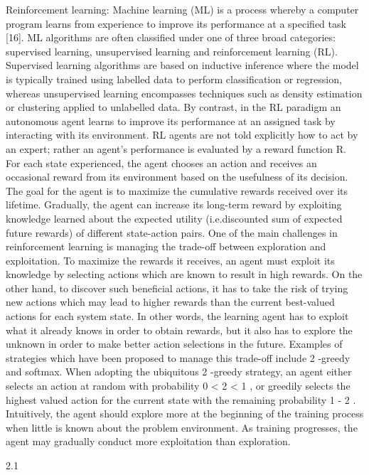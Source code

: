	
Reinforcement learning:
Machine learning (ML) is a process whereby a computer program learns from experience to improve its performance at a specified task [16]. ML algorithms are often classified under
one of three broad categories: supervised learning, unsupervised learning and reinforcement learning (RL). Supervised learning algorithms are based on inductive inference where the model is typically trained using labelled data to perform classification or regression, whereas unsupervised learning encompasses techniques such as density estimation or clustering applied to unlabelled data. By contrast, in the RL paradigm an autonomous agent learns to improve its performance at an assigned task by interacting with its environment.
RL agents are not told explicitly how to act by an expert; rather an agent's performance is evaluated by a reward function R. For each state experienced, the agent chooses an action and receives an occasional reward from its environment based on the usefulness of its decision. The goal for the agent is to maximize the cumulative rewards received over its lifetime. Gradually, the agent can increase its long-term reward by exploiting knowledge learned about the expected utility (i.e.discounted sum of expected future rewards) of different state-action pairs. One of the main challenges in reinforcement learning is managing the trade-off between exploration and exploitation. To maximize the rewards it receives, an agent must exploit its knowledge by selecting actions which are known to result in high rewards. On the other hand, to discover such beneficial actions, it has to take the risk of trying new actions which may lead to higher rewards than the current best-valued actions for each system state. In other words, the learning agent has to exploit what it already knows in order to obtain rewards, but it also has to explore the unknown in order to make better action selections in the future. Examples of strategies which have been proposed to manage this trade-off include 2 -greedy and softmax. When adopting the ubiquitous 2 -greedy strategy, an agent either selects an action at random with probability 0 < 2 < 1 , or greedily selects the highest valued action for the current state with the remaining probability 1 - 2 . Intuitively, the agent should explore more at the beginning of the training process when little is known about the problem environment. As training progresses, the agent may gradually conduct more exploitation than exploration.

2.1

